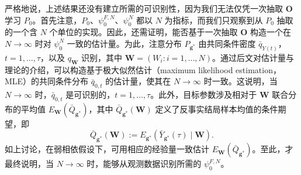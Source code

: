 严格地说，上述结果还没有建立所需的可识别性，因为我们无法仅凭一次抽取 $\mathbf O$ 学习 $P_0$。首先注意，$P_0$、$\psi_0^{F,N}$、$\psi_0^N$ 都以 $N$ 为指标，而我们只观察到从 $P_0$ 抽取的一个含 $N$ 个单位的实现。因此，还需证明，能否基于一次抽取 $\mathbf O$ 构造一个在 $N\to\infty$ 时对 $\psi_0^N$ 一致的估计量。为此，注意分布 $P_{\mathbf g^*}$ 由共同条件密度 $\bar q_{Y(t)}$，$t=1,\ldots,\tau$，以及 $q_{\mathbf W}$ 识别，其中 $\mathbf W=(W_i:i=1,\ldots,N)$。通过后文对估计量与理论的介绍，可以构造基于极大似然估计（maximum likelihood estimation，MLE）的共同条件分布 $\bar q_{0,t}$ 的估计量，使其在 $N\to\infty$ 时一致。这说明，当 $N\to\infty$ 时，$\bar q_{0,t}$ 是可识别的，$t=1,\ldots,\tau$。此外，目标参数涉及相对于 $\mathbf W$ 联合分布的平均值 $E_{\mathbf W}(\bar Q_{\mathbf g^*})$，其中 $\bar Q_{\mathbf g^*}(\mathbf W)$ 定义了反事实结局样本均值的条件期望，即
\[
 \bar Q_{\mathbf g^*}(\mathbf W):=E_{\mathbf g^*}(\bar Y_{\mathbf g^*}(\tau)\mid\mathbf W).
\]
如上讨论，在弱相依假设下，可用相应的经验量一致估计 $E_{\mathbf W}(\bar Q_{\mathbf g^*})$。至此，才最终说明，当 $N\to\infty$ 时，能够从观测数据识别所需的 $\psi_0^{F,N}$。
